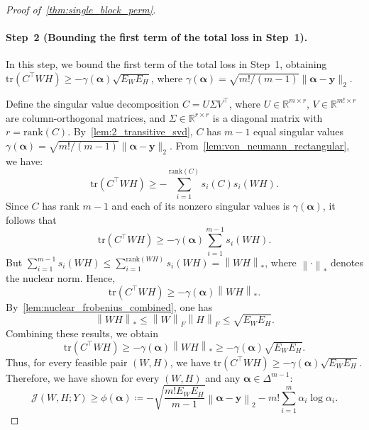 \documentclass[11pt]{article}
\begin{document}
\begin{proof}[Proof of~\cref{thm:single_block_perm}]
\paragraph{Step~2 (Bounding the first term of the total loss in Step~1).}
In this step, we bound the first term of the total loss in Step~1, obtaining \(\mathrm{tr}(C^\top WH)\ge -\gamma(\boldsymbol{\alpha})\sqrt{E_W E_H}\), where $\gamma(\boldsymbol{\alpha})=\sqrt{m!/(m-1)}\|\boldsymbol{\alpha}-\boldsymbol{y}\|_2$.

Define the singular value decomposition \( C = U \Sigma V^\top \), where \( U \in \mathbb{R}^{m \times r} \), \( V \in \mathbb{R}^{m! \times r} \) are column-orthogonal matrices, and \( \Sigma \in \mathbb{R}^{r \times r} \) is a diagonal matrix with \( r = \text{rank}(C) \).
By~\cref{lem:2_transitive_svd}, $C$ has $m-1$ equal singular values $\gamma(\boldsymbol{\alpha})=\sqrt{m!/(m-1)}\|\boldsymbol{\alpha}-\boldsymbol{y}\|_2$.
From~\cref{lem:von_neumann_rectangular}, we have:
\begin{equation}
\label{eq:von_neumann}
\mathrm{tr}\left(C^\top W H\right)
\ge
- \sum_{i=1}^{\mathrm{rank}(C)} s_i(C)s_i(W H).
\end{equation}
Since \(C\) has rank \(m-1\) and each of its nonzero singular values is \(\gamma(\boldsymbol{\alpha})\), it follows that
\[
\mathrm{tr}\left(C^\top W H\right)
\ge
- \gamma(\boldsymbol{\alpha})\sum_{i=1}^{m-1} s_i(W H).
\]
But \(\sum_{i=1}^{m-1}s_i(W H) \le \sum_{i=1}^{\mathrm{rank}(W H)}s_i(W H) = \left\|W H\right\|_{*}\),
where \(\left\|\cdot\right\|_{*}\) denotes the nuclear norm. Hence,
\begin{equation}
\label{eq:trace_bound_1}
\mathrm{tr}\left(C^\top W H\right)
\ge
- \gamma(\boldsymbol{\alpha})\left\|W H\right\|_{*}.
\end{equation}
By~\cref{lem:nuclear_frobenius_combined}, one has
\begin{equation}
\label{eq:nuclear_frobenius_combined}
\left\|W H\right\|_{*}
\le
\left\|W\right\|_F \left\|H\right\|_F
\le
\sqrt{E_W E_H}.
\end{equation}
Combining these results, we obtain
\begin{equation}
\label{eq:trace_bound}
\mathrm{tr}\left(C^\top W H\right)
\ge
- \gamma(\boldsymbol{\alpha})\left\|W H\right\|_{*}
\ge
- \gamma(\boldsymbol{\alpha})\sqrt{E_W E_H}.
\end{equation}
Thus, for every feasible pair $\left(W,H\right)$, we have
$\mathrm{tr} \left(C^\top W H\right) \ge - \gamma(\boldsymbol{\alpha})\sqrt{E_W E_H}$. Therefore, we have shown for every $(W,H)$ and any $\boldsymbol{\alpha}\in\Delta^{m-1}$:
\begin{equation}
  \mathcal J(W,H;Y) \ge \phi(\boldsymbol{\alpha}) \coloneqq
  -\sqrt{\frac{m! E_W E_H}{ m-1 }} 
     \left\|\boldsymbol{\alpha}-\boldsymbol{y}\right\|_2
   - m!\sum_{i=1}^m \alpha_i\log\alpha_i.
  \label{eq:phi_def}
\end{equation}


\end{proof}
\end{document}

